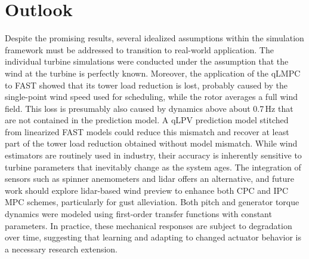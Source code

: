 \section{Outlook} \label{sec:Outlook}
Despite the promising results, several idealized assumptions within the simulation framework must be addressed to transition to real-world application. The individual turbine simulations were conducted under the assumption that the wind at the turbine is perfectly known. Moreover, the application of the qLMPC to FAST showed that its tower load reduction is lost, probably caused by the single-point wind speed used for scheduling, while the rotor averages a full wind field. This loss is presumably also caused by dynamics above about 0.7\,Hz that are not contained in the prediction model. A qLPV prediction model stitched from linearized FAST models could reduce this mismatch and recover at least part of the tower load reduction obtained without model mismatch.
%
While wind estimators are routinely used in industry, their accuracy is inherently sensitive to turbine parameters that inevitably change as the system ages. The integration of sensors such as spinner anemometers and lidar offers an alternative, and future work should explore lidar-based wind preview to enhance both CPC and IPC MPC schemes, particularly for gust alleviation. Both pitch and generator torque dynamics were modeled using first-order transfer functions with constant parameters. In practice, these mechanical responses are subject to degradation over time, suggesting that learning and adapting to changed actuator behavior is a necessary research extension.

